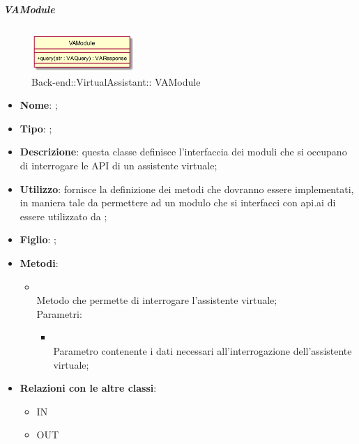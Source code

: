 \hypertarget{VAModule_label}{\subparagraph{ VAModule}}
\begin{figure}[h]
	\centering
	\includegraphics[width=0.35\textwidth,height=\textheight,keepaspectratio]{images/ClassVAModule.png}
	\caption{Back-end::VirtualAssistant:: VAModule}
\end{figure}
\begin{itemize}
	\item \textbf{Nome}: ;
	\item \textbf{Tipo}: ;
	\item \textbf{Descrizione}: questa classe definisce l'interfaccia dei moduli che si occupano di interrogare le API di un assistente virtuale;
	\item \textbf{Utilizzo}: fornisce la definizione dei metodi che dovranno essere implementati, in maniera tale da permettere ad un modulo che si interfacci con api.ai di essere utilizzato da ;
	\item \textbf{Figlio}: ;
	\item \textbf{Metodi}:
	\begin{itemize}
		\item[]  \\		Metodo che permette di interrogare l'assistente virtuale;\\
		Parametri:
		\begin{itemize}
			\item {} \\
			Parametro contenente i dati necessari all'interrogazione dell'assistente virtuale;
		\end{itemize}
	\end{itemize}
	\item \textbf{Relazioni con le altre classi}:
	\begin{itemize}
		\item IN \hyperlink{VAService_label}{}
		\item OUT \hyperlink{VAQuery_label}{}
	\end{itemize}
\end{itemize}
\FloatBarrier

